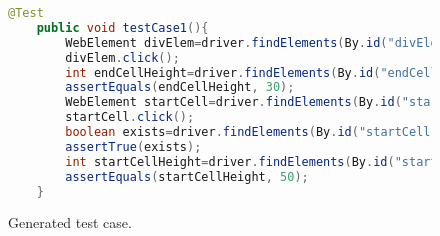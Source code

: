 \begin{figure}
\begin{lstlisting}[language=Java]
	@Test
	public void testCase1(){
		WebElement divElem=driver.findElements(By.id("divElem"));
		divElem.click();
		int endCellHeight=driver.findElements(By.id("endCell")).getSize().height;
		assertEquals(endCellHeight, 30);
		WebElement startCell=driver.findElements(By.id("startCell"));
		startCell.click();
		boolean exists=driver.findElements(By.id("startCell")).size!=0;
		assertTrue(exists);
		int startCellHeight=driver.findElements(By.id("startCell")).getSize().height;
		assertEquals(startCellHeight, 50);
	}
\end{lstlisting}
\vspace{-0.1in} 

\caption{Generated \selenium test case.}
\label{Fig:domTestSample}
\vspace{-0.2in} 
\end{figure}